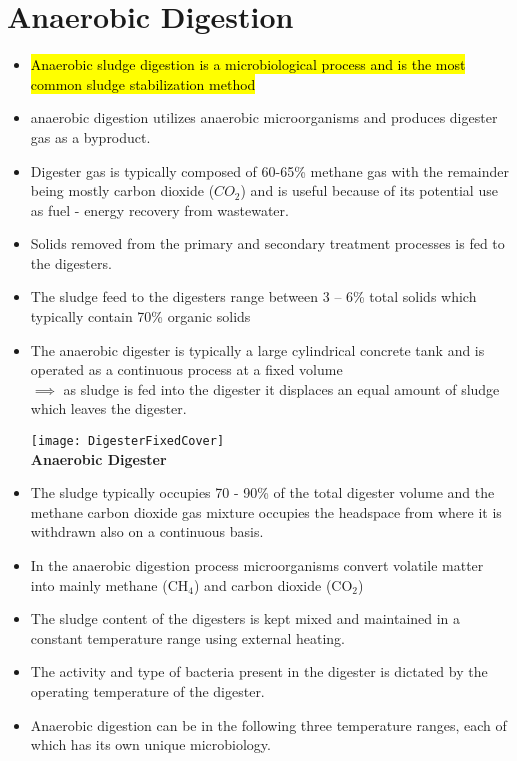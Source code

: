 \section{Anaerobic Digestion}
			\begin{itemize}
			\item \hl{Anaerobic sludge digestion is a microbiological process and is the most common sludge stabilization method}
			\item anaerobic digestion utilizes anaerobic microorganisms and produces digester gas as a byproduct.
			\item Digester gas is typically composed of 60-65\% methane gas with the remainder being mostly carbon dioxide ($CO_2$) and is useful because of its potential use as fuel - energy recovery from wastewater.
		\item Solids removed from the primary and secondary treatment processes is fed to the digesters.  
		\item The sludge feed to the digesters range between 3 – 6\% total solids which typically contain 70\% organic solids
		\item The anaerobic digester is typically a large cylindrical concrete tank and is operated as a continuous process at a fixed volume\\ $\implies$ as sludge is fed into the digester it displaces an equal amount of sludge which leaves the digester.
\begin{center}
\texttt{[image: DigesterFixedCover]}\\
\textbf{Anaerobic Digester}\\
\end{center}
		\item The sludge typically occupies 70 - 90\% of the total digester volume and the methane carbon dioxide gas mixture occupies the headspace from where it is withdrawn also on a continuous basis.
		\item In the anaerobic digestion process microorganisms convert volatile matter into mainly methane (CH$_4$) and carbon dioxide (CO$_2$)
		\item The sludge content of the digesters is kept mixed and maintained in a constant temperature range using external heating.
		\item The activity and type of bacteria present in the digester is dictated by the operating temperature of the digester.
		\item Anaerobic digestion can be in the following three temperature ranges, each of which has its own unique microbiology.\\

\end{itemize}
